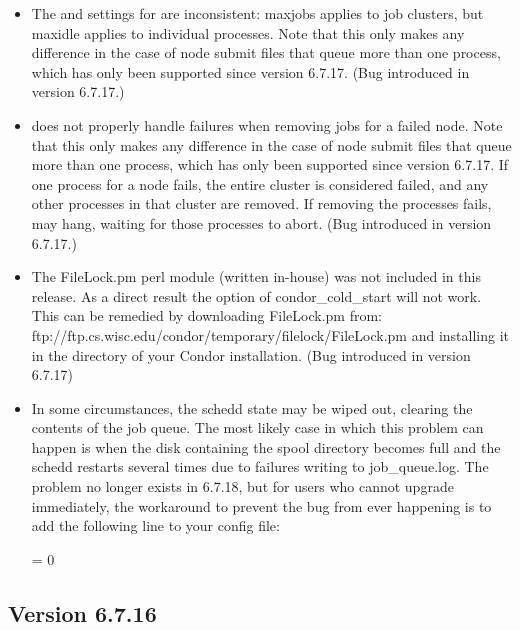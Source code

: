 \begin{itemize}
\item The  and  settings for  are
inconsistent: maxjobs applies to job clusters, but maxidle applies
to individual processes.  Note that this only makes any difference
in the case of node submit files that queue more than one process,
which has only been supported since version 6.7.17.
(Bug introduced in version 6.7.17.)

\item {} does not properly handle failures when removing
jobs for a failed node.  Note that this only makes any difference
in the case of node submit files that queue more than one process,
which has only been supported since version 6.7.17.  If one process
for a node fails, the entire cluster is considered failed, and any
other processes in that cluster are removed.  If removing the processes
fails,  may hang, waiting for those processes to abort.
(Bug introduced in version 6.7.17.)

\item The FileLock.pm perl module (written in-house) was not included
  in this release.  As a direct result the  option of
  condor\_cold\_start will not work.  This can be remedied by
  downloading FileLock.pm from:
  ftp://ftp.cs.wisc.edu/condor/temporary/filelock/FileLock.pm and
  installing it in the  directory of your Condor installation.
  (Bug introduced in version 6.7.17)

\item In some circumstances, the schedd state may be wiped out,
clearing the contents of the job queue.  The most likely case in which
this problem can happen is when the disk containing the spool
directory becomes full and the schedd restarts several times due to
failures writing to job\_queue.log.  The problem no longer exists in
6.7.18, but for users who cannot upgrade immediately, the workaround
to prevent the bug from ever happening is to add the following line to
your config file:

 = 0

\end{itemize}

\subsection*{\label{sec:New-6-7.16}Version 6.7.16}

